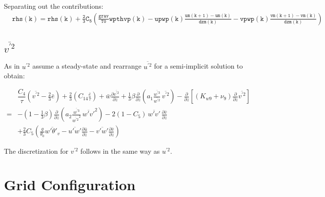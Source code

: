 \documentclass[11pt,fleqn]{article}
\newcommand{\ptlder}[2]{\frac{\partial #1}{\partial #2}}
\begin{document}
Separating out the contributions:
%
\begin{equation}
\begin{split}
&\mathtt{rhs(k) = rhs(k) + \frac{2}{3} C_5 
  \left( 
    \frac{grav}{T0} wpthvp(k) 
       - upwp(k) \frac{um(k+1)-um(k)}{dzm(k)}
       - vpwp(k) \frac{vm(k+1)-vm(k)}{dzm(k)}
  \right)}
\end{split}
\end{equation}
%

\subsection{$\overline{v^{'2}}$}
As in $u^{'2}$ assume a steady-state and rearrange $\overline{u^{'2}}$ for a 
semi-implicit solution to obtain:

\begin{equation}
\begin{split}
\label{eq_vp2_ss}
& \dfrac{C_4}{\tau} 
  \left(
    \overline{v^{'2}} - \frac{2}{3} \bar{e}
  \right)
  + \frac{2}{3} 
     \left( 
        C_{14} \frac{\bar{e}}{\tau} 
     \right) 
+ \bar{w}\ptlder{\overline{v^{'2}}}{z}
+ \frac{1}{3} \beta
   \ptlder{}{z}
     \left( 
       a_1
       \frac{\overline{w^{'3}}}{\overline{w^{'2}}} \,
       \overline{v^{'2}}
     \right)
- \ptlder{}{z} \left[ \left( K_{w9} + \nu_9 \right)
                      \ptlder{}{z} \overline{v^{'2}}
               \right]  \\
=& - \left( 1 - \frac{1}{3}\beta \right)
       \ptlder{}{z}
         \left( 
           a_2
           \frac{\overline{w^{'3}}}{\overline{w^{'2}}^2} \,
           \overline{w'v'}^2
         \right)
   - 2 (1 - C_{5} ) \, \overline{w'v'} \, \ptlder{\bar{v}}{z} \\
 & + \frac{2}{3} C_5
     \left(
       \frac{g}{\theta_0} \overline{w'\theta'_v} 
       - \overline{u'w'}\ptlder{\bar{u}}{z} 
       - \overline{v'w'}\ptlder{\bar{v}}{z} 
     \right)
\end{split}
\end{equation}

The discretization for $v^{'2}$ follows in the same way as $u^{'2}$.

\section{Grid Configuration}
\end{document}
